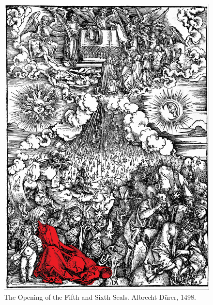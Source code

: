   \begin{figure}[p]
  	\centering
  	\includegraphics[scale=0.2]{Durer/Durer_Sixth_Seal.jpg}
  	\caption[The Opening of the Fifth and Sixth Seals]{The Opening of the Fifth and Sixth Seals. Albrecht Dürer, 1498.}
  \end{figure}